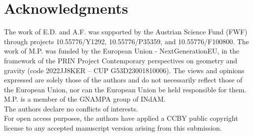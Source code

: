 \documentclass[reqno,11pt]{amsart}
\numberwithin{equation}{section}
\theoremstyle{definition} %
\theoremstyle{plain}
\theoremstyle{definition}
\theoremstyle{remark}
\begin{document}
\section{Acknowledgments}
The work of E.D. and A.F. was supported by the Austrian Science Fund (FWF) through projects  10.55776/Y1292, 10.55776/P35359, and 10.55776/F100800. The work of M.P.  was funded by the European Union - NextGenerationEU, in the framework of the PRIN Project Contemporary perspectives on geometry and gravity (code 2022JJ8KER – CUP G53D23001810006). The views and opinions expressed are solely those of the authors and do not necessarily reflect those of the European Union, nor can the European Union be held responsible for them. M.P. is a member of the GNAMPA group of INdAM.      
\\The authors declare no conflicts of interests.\\
For open access purposes, the authors have applied
a CCBY public copyright license to any accepted manuscript version arising from this
submission.
\end{document}
